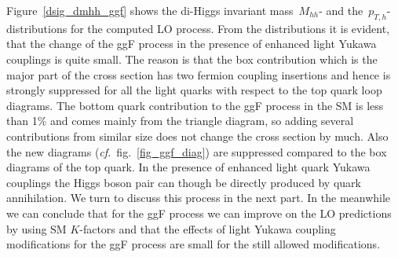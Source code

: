 Figure~\ref{dsig_dmhh_ggf} shows the di-Higgs invariant mass~$M_{hh}$- and the~$p_{T,h}$-distributions for the computed LO process.
From the distributions it is evident, that the change of the ggF process in the presence of enhanced light Yukawa couplings is quite small. The reason is that the box contribution which is the major part of the cross section has two fermion coupling insertions and hence is strongly suppressed for all the light quarks with respect to the top quark loop diagrams. The bottom quark contribution to the ggF process in the SM is less than 1\% and comes mainly from the triangle diagram, so adding several contributions from similar size does not change the cross section by much. Also the new diagrams (\textit{cf.}~fig.~\ref{fig_ggf_diag}) are suppressed compared to the box diagrams of the top quark.
In the presence of enhanced light quark Yukawa couplings the Higgs boson pair can though be directly produced by quark annihilation. We turn to discuss this process in the next part. In the meanwhile we can conclude that for the ggF process we can improve on the LO predictions by using SM $K$-factors and that the effects of light Yukawa coupling modifications for the ggF process are small for the still allowed modifications.
